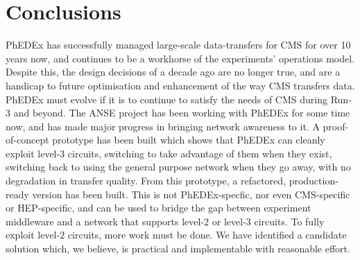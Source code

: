 \section{Conclusions}

PhEDEx has successfully managed large-scale data-transfers for CMS for over 10 years now, and continues to be a workhorse of the experiments' operations model. Despite this, the design decisions of a decade ago are no longer true, and are a handicap to future optimisation and enhancement of the way CMS transfers data. PhEDEx must evolve if it is to continue to satisfy the needs of CMS during Run-3 and beyond.
The ANSE project has been working with PhEDEx for some time now, and has made major progress in bringing network awareness to it. A proof-of-concept prototype has been built which shows that PhEDEx can cleanly exploit level-3 circuits, switching to take advantage of them when they exist, switching back to using the general purpose network when they go away, with no degradation in transfer quality.
From this prototype, a refactored, production-ready version has been built. This is not PhEDEx-specfic, nor even CMS-specific or HEP-specific, and can be used to bridge the gap between experiment middleware and a network that supports level-2 or level-3 circuits.
To fully exploit level-2 circuits, more work must be done. We have identified a candidate solution which, we believe, is practical and implementable with reasonable effort.